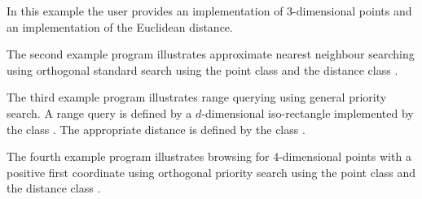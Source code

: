In this example the user provides an implementation of 3-dimensional points and an
implementation of the Euclidean distance.


The second example program illustrates approximate nearest neighbour searching
using orthogonal standard search using the point class 
and the distance class .
 

The third example program illustrates range querying using general priority search.
A range query is defined by a $d$-dimensional iso-rectangle implemented by
the class . The appropriate distance is defined by
the class .


The fourth example program illustrates browsing for $4$-dimensional points with
a positive first coordinate using orthogonal priority search
using the point class 
and the distance class .
 



